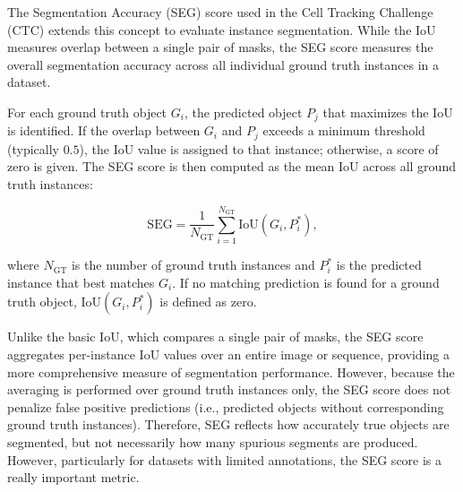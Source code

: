 \bigskip
The Segmentation Accuracy (SEG) score used in the Cell Tracking Challenge (CTC) extends this concept to evaluate instance segmentation.
While the IoU measures overlap between a single pair of masks, the SEG score measures the overall segmentation accuracy across all individual ground truth instances in a dataset.

For each ground truth object $G_i$, the predicted object $P_j$ that maximizes the IoU is identified.
If the overlap between $G_i$ and $P_j$ exceeds a minimum threshold (typically $0.5$), the IoU value is assigned to that instance; otherwise, a score of zero is given.
The SEG score is then computed as the mean IoU across all ground truth instances:

\begin{equation}
    \mathrm{SEG} = \frac{1}{N_\mathrm{GT}} \sum_{i=1}^{N_\mathrm{GT}} \mathrm{IoU}(G_i, P_i^\ast),
\end{equation}

where $N_\mathrm{GT}$ is the number of ground truth instances and $P_i^\ast$ is the predicted instance that best matches $G_i$.
If no matching prediction is found for a ground truth object, $\mathrm{IoU}(G_i, P_i^\ast)$ is defined as zero.

\bigskip
Unlike the basic IoU, which compares a single pair of masks, the SEG score aggregates per-instance IoU values over an entire image or sequence, providing a more comprehensive measure of segmentation performance.
However, because the averaging is performed over ground truth instances only, the SEG score does not penalize false positive predictions (i.e., predicted objects without corresponding ground truth instances).
Therefore, SEG reflects how accurately true objects are segmented, but not necessarily how many spurious segments are produced. However, particularly for datasets with limited annotations, the SEG score is a really important metric. 




